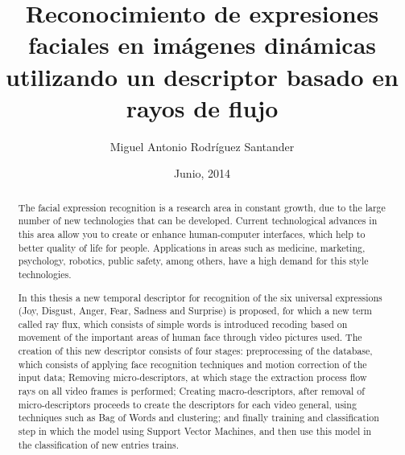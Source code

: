 \documentclass[final]{udpthesis}
\begin{document}
\frontmatter
\title{Reconocimiento de expresiones faciales en imágenes dinámicas utilizando un descriptor basado en rayos de flujo}

\author{Miguel Antonio Rodríguez Santander}

\date{Junio, 2014}


\dedicatory{}

\makecover

\tableofcontents%
\listoffigures%
\listoftables%

\begin{abstract}
The facial expression recognition is a research area in constant growth, due to the large number of new technologies that can be developed. Current technological advances in this area allow you to create or enhance human-computer interfaces, which help to better quality of life for people. Applications in areas such as medicine, marketing, psychology, robotics, public safety, among others, have a high demand for this style technologies.

In this thesis a new temporal descriptor for recognition of the six universal expressions (Joy, Disgust, Anger, Fear, Sadness and Surprise) is proposed, for which a new term called ray flux, which consists of simple words is introduced recoding based on movement of the important areas of human face through video pictures used. The creation of this new descriptor consists of four stages: preprocessing of the database, which consists of applying face recognition techniques and motion correction of the input data; Removing micro-descriptors, at which stage the extraction process flow rays on all video frames is performed; Creating macro-descriptors, after removal of micro-descriptors proceeds to create the descriptors for each video general, using techniques such as Bag of Words and clustering; and finally training and classification step in which the model using Support Vector Machines, and then use this model in the classification of new entries trains.
\end{abstract}
\end{document}
